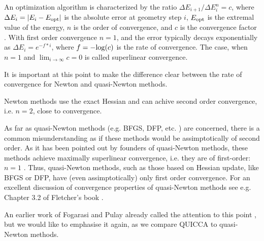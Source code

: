 \documentclass[prl,twocolumn,showpacs,twocolumngrid,superbib]{revtex4}
\begin{document}
An optimization algorithm is characterized by the ratio $ {\Delta E_{i+1}}/{\Delta E_{i}^n} =c$,
where $\Delta E_i = |E_{i}-E_{\rm opt}| $ is the absolute error at geometry step $i$,
$E_{\rm opt}$ is the extremal value of the energy, $n$ is the order of convergence, 
and $c$ is the convergence factor \cite{Quarteroni}.  With first order convergence $n=1$, and
the error typically decays exponentially as $\Delta E_i = e^{-f*i}$, where $f=-{\rm log}(c)$ is the 
rate of convergence. 
The case, when $n=1$ and $\lim_{i \to \infty} c = 0$ is called superlinear convergence.

It is important at this point to make the difference clear between the 
rate of convergence for Newton and quasi-Newton methods. 

Newton methods use the exact Hessian and can achive second order 
convergence, i.e. $n=2$, close to convergence.

As far as quasi-Newton methods (e.g. BFGS, DFP, etc. \cite{RFletcher})
are concerned, there is a common 
misunderstanding as if these methods would be assimptotically of second order.
As it has been pointed out by founders of quasi-Newton methods,
these methods achieve maximally superlinear convergence, i.e. they are
of first-order: $n=1$ \cite{RFletcher}. Thus, quasi-Newton methods,
such as those based on Hessian update, like BFGS or DFP, have 
(even assimptotically) only
first order convergence. For an excellent discussion of convergence
properties of quasi-Newton methods see e.g. Chapter 3.2 of Fletcher's book
\cite{RFletcher}.

An earlier work of Fogarasi and Pulay already called the attention 
to this point \cite{Pulay_natural_internals},
but we would like to emphasise it again, as we compare QUICCA to quasi-Newton
methods.

\end{document}
